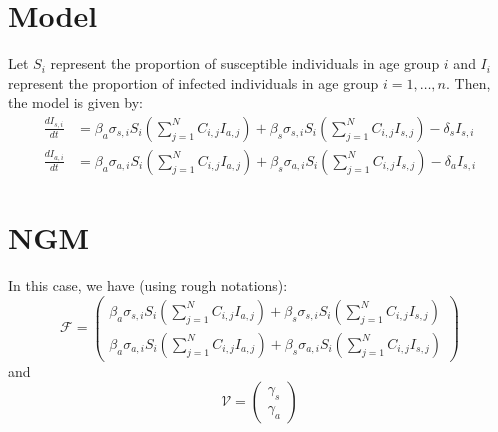 \documentclass[12pt]{article}
\date{\today}
\begin{document}
\begin{flushleft}{
	\Large
	\textbf{}
}
\newline
\end{flushleft}

\section{Model}

Let $S_i$ represent the proportion of susceptible individuals in age group $i$ and $I_i$ represent the proportion of infected individuals in age group $i = 1, \dots, n$. Then, the model is given by:
\begin{align}
\frac{dI_{s,i}}{dt} &= \beta_a \sigma_{s, i} S_i \left(\sum_{j=1}^N C_{i, j} I_{a, j} \right) + \beta_s \sigma_{s, i} S_i \left(\sum_{j=1}^N C_{i, j} I_{s, j} \right) - \delta_s I_{s, i}\\
\frac{dI_{a,i}}{dt} &= \beta_a \sigma_{a, i} S_i \left(\sum_{j=1}^N C_{i, j} I_{a, j} \right) + \beta_s \sigma_{a, i} S_i \left(\sum_{j=1}^N C_{i, j} I_{s, j} \right) - \delta_a I_{s, i}
\end{align}

\section{NGM}

In this case, we have (using rough notations):
\begin{equation}
\mathcal F = \begin{pmatrix}
\beta_a \sigma_{s, i} S_i \left(\sum_{j=1}^N C_{i, j} I_{a, j} \right) + \beta_s \sigma_{s, i} S_i \left(\sum_{j=1}^N C_{i, j} I_{s, j} \right)\\
\beta_a \sigma_{a, i} S_i \left(\sum_{j=1}^N C_{i, j} I_{a, j} \right) + \beta_s \sigma_{a, i} S_i \left(\sum_{j=1}^N C_{i, j} I_{s, j} \right) 
\end{pmatrix}
\end{equation}
and
\begin{equation}
\mathcal V = \begin{pmatrix}
\gamma_s\\
\gamma_a
\end{pmatrix}
\end{equation}
\end{document}
